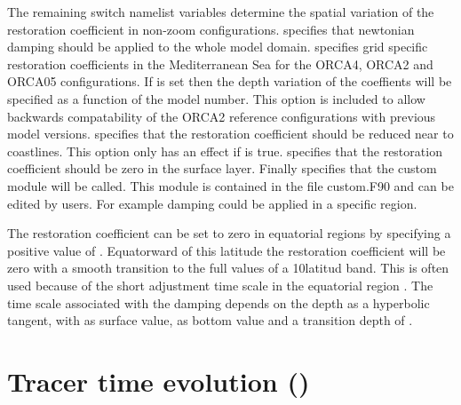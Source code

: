 \documentclass[NEMO_book]{subfiles}
\begin{document}
The remaining switch namelist variables determine the spatial variation of the restoration coefficient in non-zoom configurations. 
 specifies that newtonian damping should be applied to the whole model domain. 
 specifies grid specific restoration coefficients in the Mediterranean Sea 
for the ORCA4, ORCA2 and ORCA05 configurations. 
If  is set then the depth variation of the coeffients will be specified as 
a function of the model number. This option is included to allow backwards compatability of the ORCA2 reference 
configurations with previous model versions. 
 specifies that the restoration coefficient should be reduced near to coastlines. 
This option only has an effect if  is true. 
 specifies that the restoration coefficient should be zero in the surface layer. 
Finally  specifies that the custom module will be called. 
This module is contained in the file custom.F90 and can be edited by users. For example damping could be applied in a specific region.

The restoration coefficient can be set to zero in equatorial regions by specifying a positive value of . 
Equatorward of this latitude the restoration coefficient will be zero with a smooth transition to 
the full values of a 10\deg latitud band. 
This is often used because of the short adjustment time scale in the equatorial region 
\citep{Reverdin1991, Fujio1991, Marti_PhD92}. The time scale associated with the damping depends on the depth as a 
hyperbolic tangent, with  as surface value,  as bottom value and a transition depth of .  

\section  [Tracer time evolution (\textit{tranxt})]
		{Tracer time evolution ()}
\label{TRA_nxt}
\end{document}
